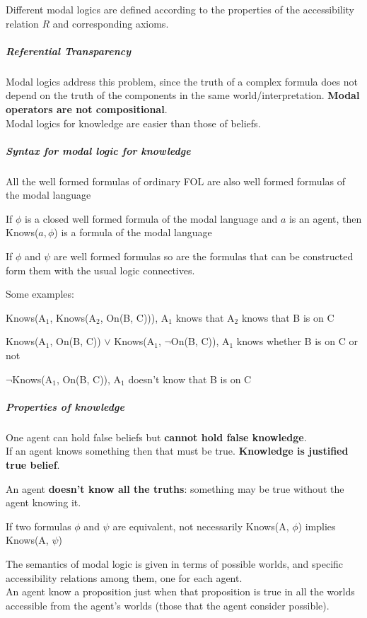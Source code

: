 \documentclass[10pt]{report}
\begin{document}
Different modal logics are defined according to the properties of the accessibility relation $R$ and corresponding axioms.
\subparagraph{Referential Transparency} Modal logics address this problem, since the truth of a complex formula does not depend on the truth of the components in the same world/interpretation. \textbf{Modal operators are not compositional}.\\
Modal logics for knowledge are easier than those of beliefs.
\subparagraph{Syntax for modal logic for knowledge} \begin{list}{}{}
	\item All the well formed formulas of ordinary FOL are also well formed formulas of the modal language
	\item If $\phi$ is a closed well formed formula of the modal language and $a$ is an agent, then Knows($a,\phi$) is a formula of the modal language
	\item If $\phi$ and $\psi$ are well formed formulas so are the formulas that can be constructed form them with the usual logic connectives.
\end{list}
Some examples:
\begin{list}{}{}
	\item Knows(A$_1$, Knows(A$_2$, On(B, C))), A$_1$ knows that A$_2$ knows that B is on C
	\item Knows(A$_1$, On(B, C)) $\vee$ Knows(A$_1$, $\neg$On(B, C)), A$_1$ knows whether B is on C or not
	\item $\neg$Knows(A$_1$, On(B, C)), A$_1$ doesn't know that B is on C
\end{list}
\subparagraph{Properties of knowledge}\begin{list}{}{}
	\item One agent can hold false beliefs but \textbf{cannot hold false knowledge}.\\
	If an agent knows something then that must be true. \textbf{Knowledge is justified true belief}.
	\item An agent \textbf{doesn't know all the truths}: something may be true without the agent knowing it.
	\item If two formulas $\phi$ and $\psi$ are equivalent, not necessarily Knows(A, $\phi$) implies Knows(A, $\psi$)
\end{list}
The semantics of modal logic is given in terms of possible worlds, and specific accessibility relations among them, one for each agent.\\
An agent know a proposition just when that proposition is true in all the worlds accessible from the agent's worlds (those that the agent consider possible).\\
\end{document}
